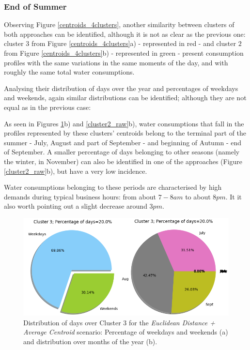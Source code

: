 \documentclass[9pt,journal,compsoc]{IEEEtran}
\begin{document}
\subsubsection{End of Summer}

Observing Figure \ref{centroids_4clusters}, another similarity between clusters of both approaches can be identified, although it is not as clear as the previous one: cluster $3$ from Figure \ref{centroids_4clusters}a) - represented in red - and cluster $2$ from Figure \ref{centroids_4clusters}b) - represented in green - present consumption profiles with the same variations in the same moments of the day, and with roughly the same total water consumptions.

Analysing their distribution of days over the year and percentages of weekdays and weekends, again similar distributions can be identified; although they are not equal as in the previous case:

As seen in Figures \ref{cluster3_euclidean}b) and \ref{cluster2_raw}b), water consumptions that fall in the profiles represented by these clusters' centroids belong to the terminal part of the summer - July, August and part of September - and beginning of Autumn - end of September. A smaller percentage of days belonging to other seasons (namely the winter, in November) can also be identified in one of the approaches (Figure \ref{cluster2_raw}b), but have a very low incidence.

Water consumptions belonging to these periods are characterised by high demands during typical business hours: from about $7-8am$ to about $8pm$. It it also worth pointing out a slight decrease around $3pm$.

\begin{figure}
	\centering
	\includegraphics[scale=0.4]{images/percent_week__months_euc_average_cluster3_k4.png}
	\caption{Distribution of days over Cluster $3$ for the \emph{Euclidean Distance + Average Centroid} scenario: Percentage of weekdays and weekends (a) and distribution over months of the year (b).}
	\label{cluster3_euclidean}
\end{figure}
\end{document}
